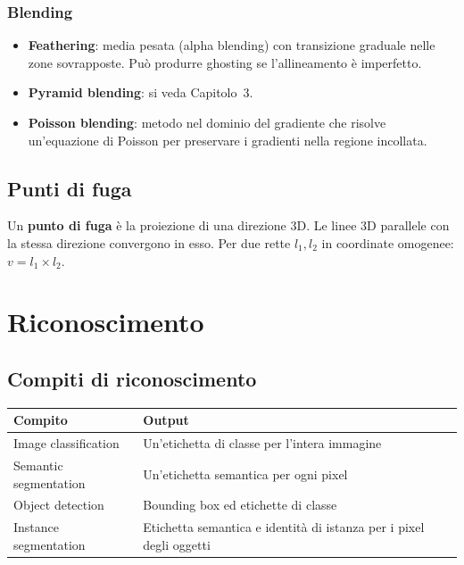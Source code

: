 \documentclass[12pt, a4paper]{report}
\begin{document}
\subsection{Blending}

\begin{itemize}
  \item \textbf{Feathering}: media pesata (alpha blending) con transizione
        graduale nelle zone sovrapposte. Può produrre ghosting se l'allineamento
        è imperfetto.
  \item \textbf{Pyramid blending}: si veda Capitolo~3.
  \item \textbf{Poisson blending}: metodo nel dominio del gradiente che risolve
        un'equazione di Poisson per preservare i gradienti nella regione incollata.
\end{itemize}

\section{Punti di fuga}

Un \textbf{punto di fuga} è la proiezione di una direzione 3D. Le linee 3D
parallele con la stessa direzione convergono in esso. Per due rette $l_1,l_2$
in coordinate omogenee: $v=l_1\times l_2$.

\chapter{Riconoscimento}

\section{Compiti di riconoscimento}

\begin{center}
\begin{tabular}{ll}
\toprule
\textbf{Compito}&\textbf{Output}\\
\midrule
Image classification  & Un'etichetta di classe per l'intera immagine\\
Semantic segmentation & Un'etichetta semantica per ogni pixel\\
Object detection      & Bounding box ed etichette di classe\\
Instance segmentation & Etichetta semantica e identità di istanza per i pixel degli oggetti\\
\bottomrule
\end{tabular}
\end{center}
\end{document}
